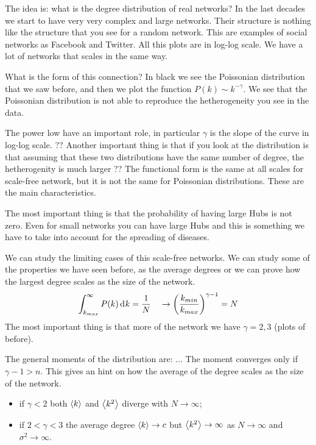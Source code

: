 \documentclass[../main/main.tex]{subfiles}
\begin{document}
The idea is: what is the degree distribution of real networks? In the last decades we start to have very very complex and large networks. Their structure is nothing like the structure that you see for a random network. This are examples of social networks as Facebook and Twitter. All this plots are in log-log scale. We have a lot of networks that scales in the same way.

What is the form of this connection? In black we see the Poissonian distribution that we saw before, and then we plot the function \( P(k) \sim k^{- \gamma  } \). We see that the Poissonian distribution is not able to reproduce the hetherogeneity you see in the data.

The power low have an important role, in particular \( \gamma   \) is the slope of the curve in log-log scale.
?? Another important thing is that if you look at the distribution  is that assuming that these two distributions have the same number of degree, the hetherogenity is much larger ??
The functional form is the same at all scales for scale-free network, but it is not the same for Poissonian distributions. These are the main characteristics.

The most important thing is that the probability of having large Hubs is not zero. Even for small networks you can have large Hubs and this is something we have to take into account for the spreading of diseases.


We can study the limiting cases of this scale-free networks. We can study some of the properties we have seen before, as the average degrees or we can prove how the largest degree scales as the size of the network.
\begin{equation*}
  \int_{k_{max}}^{\infty } P(k) \dd[]{k}  = \frac{1}{N} \quad \rightarrow  \qty(\frac{k_{min}}{k_{max}})^{\gamma -1 } = N
\end{equation*}
The most important thing is that more of the network we have \( \gamma =2,3  \) (plots of before).

The general moments of the distribution are:
...
The moment converges only if \( \gamma -1 > n  \). This gives an hint on how the average of the degree scales as the size of the network.

\begin{itemize}
\item if \( \gamma <2  \) both \( \expval{k}  \) and \( \expval{k^2}  \) diverge with \( N \rightarrow  \infty  \);

\item if \( 2 < \gamma < 3  \) the average degree \( \expval{k}  \rightarrow c \) but \( \expval{k^2}  \rightarrow \infty \) as \( N \rightarrow  \infty  \) and \( \sigma ^2 \rightarrow \infty  \).
\end{itemize}
\end{document}
